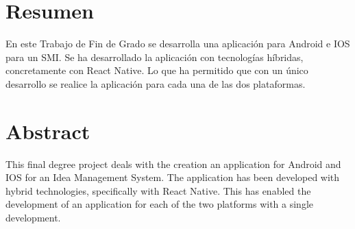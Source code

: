 \chapter{Resumen}

En este Trabajo de Fin de Grado se desarrolla una aplicación para Android e IOS para un \acf{SMI}. Se ha
desarrollado la aplicación con tecnologías híbridas, concretamente con React Native. Lo que ha permitido
que con un único desarrollo se realice la aplicación para cada una de las dos plataformas.

\chapter{Abstract}

This final degree project deals with the creation an application for Android and IOS for an Idea Management System. The application has been developed with hybrid technologies, specifically with React Native. This has enabled the development of an application for each of the two platforms with a single development.
